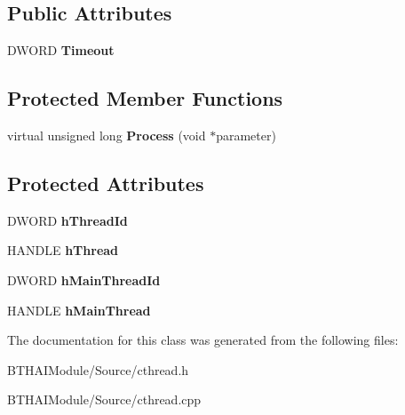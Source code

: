 \subsection*{Public Attributes}
\begin{DoxyCompactItemize}
\item 
\hypertarget{class_c_thread_abda6737d2baf6c13c4ea1f804f7c345f}{D\-W\-O\-R\-D {\bfseries Timeout}}\label{class_c_thread_abda6737d2baf6c13c4ea1f804f7c345f}

\end{DoxyCompactItemize}
\subsection*{Protected Member Functions}
\begin{DoxyCompactItemize}
\item 
\hypertarget{class_c_thread_a3129da03f36e513c9e0c72bbbfb94f5c}{virtual unsigned long {\bfseries Process} (void $\ast$parameter)}\label{class_c_thread_a3129da03f36e513c9e0c72bbbfb94f5c}

\end{DoxyCompactItemize}
\subsection*{Protected Attributes}
\begin{DoxyCompactItemize}
\item 
\hypertarget{class_c_thread_a27cabb7617144ff33fd5282ba5b33c44}{D\-W\-O\-R\-D {\bfseries h\-Thread\-Id}}\label{class_c_thread_a27cabb7617144ff33fd5282ba5b33c44}

\item 
\hypertarget{class_c_thread_a829e00b45c46d47bc2b93d7dbc523ee1}{H\-A\-N\-D\-L\-E {\bfseries h\-Thread}}\label{class_c_thread_a829e00b45c46d47bc2b93d7dbc523ee1}

\item 
\hypertarget{class_c_thread_a5f41645ba5d9e2e60ae4fab43c4477b6}{D\-W\-O\-R\-D {\bfseries h\-Main\-Thread\-Id}}\label{class_c_thread_a5f41645ba5d9e2e60ae4fab43c4477b6}

\item 
\hypertarget{class_c_thread_abe009461909ef167d085e37bdf3a0c4e}{H\-A\-N\-D\-L\-E {\bfseries h\-Main\-Thread}}\label{class_c_thread_abe009461909ef167d085e37bdf3a0c4e}

\end{DoxyCompactItemize}


The documentation for this class was generated from the following files\-:\begin{DoxyCompactItemize}
\item 
B\-T\-H\-A\-I\-Module/\-Source/cthread.\-h\item 
B\-T\-H\-A\-I\-Module/\-Source/cthread.\-cpp\end{DoxyCompactItemize}
